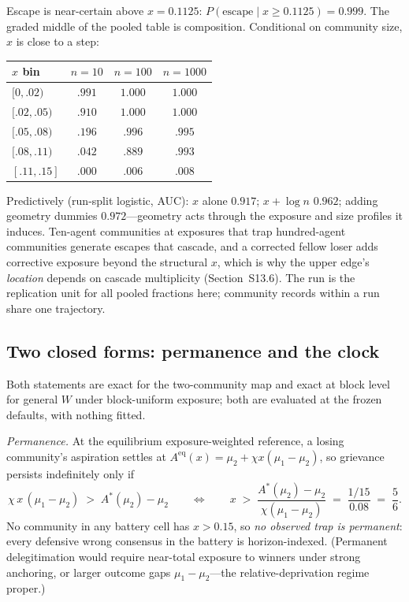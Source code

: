 \documentclass[11pt]{article}
\newcommand{\1}{\mathbf{1}}
\newcommand{\Astar}{A^{*}}
\begin{document}
\noindent Escape is near-certain above $x=0.1125$: $P(\mathrm{escape}\mid x\ge0.1125)=0.999$. The graded middle of the pooled table is composition. Conditional on community size, $x$ is close to a step:

\begin{center}
\begin{tabular}{lccc}
\hline
$x$ bin & $n=10$ & $n=100$ & $n=1000$ \\
\hline
$[0,.02)$ & $.991$ & $1.000$ & $1.000$ \\
$[.02,.05)$ & $.910$ & $1.000$ & $1.000$ \\
$[.05,.08)$ & $.196$ & $.996$ & $.995$ \\
$[.08,.11)$ & $.042$ & $.889$ & $.993$ \\
$[.11,.15]$ & $.000$ & $.006$ & $.008$ \\
\hline
\end{tabular}
\end{center}

\noindent Predictively (run-split logistic, AUC): $x$ alone $0.917$; $x+\log n$ $0.962$; adding geometry dummies $0.972$---geometry acts through the exposure and size profiles it induces. Ten-agent communities at exposures that trap hundred-agent communities generate escapes that cascade, and a corrected fellow loser adds corrective exposure beyond the structural $x$, which is why the upper edge's \emph{location} depends on cascade multiplicity (Section~S13.6). The run is the replication unit for all pooled fractions here; community records within a run share one trajectory.

\subsection{Two closed forms: permanence and the clock}
Both statements are exact for the two-community map and exact at block level for general $W$ under block-uniform exposure; both are evaluated at the frozen defaults, with nothing fitted.

\emph{Permanence.} At the equilibrium exposure-weighted reference, a losing community's aspiration settles at $A^{\mathrm{eq}}(x)=\mu_2+\chi x(\mu_1-\mu_2)$, so grievance persists indefinitely only if
\[
\chi\,x\,(\mu_1-\mu_2) \;>\; \Astar(\mu_2)-\mu_2
\qquad\Longleftrightarrow\qquad
x \;>\; \frac{\Astar(\mu_2)-\mu_2}{\chi(\mu_1-\mu_2)} \;=\; \frac{1/15}{0.08} \;=\; \frac{5}{6}.
\]
No community in any battery cell has $x>0.15$, so \emph{no observed trap is permanent}: every defensive wrong consensus in the battery is horizon-indexed. (Permanent delegitimation would require near-total exposure to winners under strong anchoring, or larger outcome gaps $\mu_1-\mu_2$---the relative-deprivation regime proper.)
\end{document}
